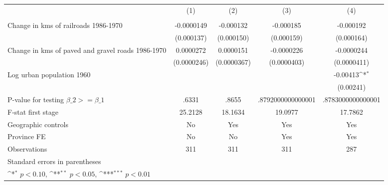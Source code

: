 {
\def\sym#1{\ifmmode^{#1}\else\(^{#1}\)\fi}
\begin{tabular}{l*{4}{c}}
\hline\hline
                &\multicolumn{1}{c}{(1)}&\multicolumn{1}{c}{(2)}&\multicolumn{1}{c}{(3)}&\multicolumn{1}{c}{(4)}\\
                &\multicolumn{1}{c}{}&\multicolumn{1}{c}{}&\multicolumn{1}{c}{}&\multicolumn{1}{c}{}\\
\hline
Change in kms of railroads 1986-1970&-0.0000149         &-0.000132         &-0.000185         &-0.000192         \\
                &(0.000137)         &(0.000150)         &(0.000159)         &(0.000164)         \\
[1em]
Change in kms of paved and gravel roads 1986-1970&0.0000272         &0.0000151         &-0.0000226         &-0.0000244         \\
                &(0.0000246)         &(0.0000367)         &(0.0000403)         &(0.0000411)         \\
[1em]
Log urban population 1960&                  &                  &                  & -0.00413\sym{*}  \\
                &                  &                  &                  &(0.00241)         \\
\hline
P-value for testing $\beta\_{2} >= \beta\_{1}$&    .6331         &    .8655         &.8792000000000001         &.8783000000000001         \\
F-stat first stage&  25.2128         &  18.1634         &  19.0977         &  17.7862         \\
Geographic controls&       No         &      Yes         &      Yes         &      Yes         \\
Province FE     &       No         &       No         &      Yes         &      Yes         \\
Observations    &      311         &      311         &      311         &      287         \\
\hline\hline
\multicolumn{5}{l}{\footnotesize Standard errors in parentheses}\\
\multicolumn{5}{l}{\footnotesize \sym{*} \(p<0.10\), \sym{**} \(p<0.05\), \sym{***} \(p<0.01\)}\\
\end{tabular}
}
